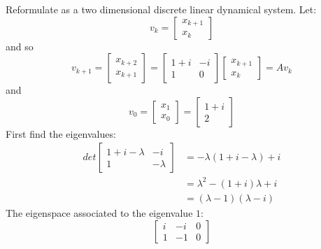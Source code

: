 \documentclass{article}
\begin{document}
\begin{Answer}
  Reformulate as a two dimensional discrete linear dynamical system. Let:
  \begin{equation*}
  v_k = \left[
  \begin{array}{c}
  x_{k+1}\\
  x_k
  \end{array}
  \right]\end{equation*}
  and so
  \begin{equation*}
  v_{k+1} = \left[
  \begin{array}{c}
  x_{k+2}\\
  x_{k+1}
  \end{array}
  \right] = \left[
  \begin{array}{cc}
  1+i & -i\\
  1 & 0
  \end{array}
  \right] \left[
  \begin{array}{c}
  x_{k+1}\\
  x_k
  \end{array}
  \right] = Av_{k}
  \end{equation*}
  and
  \begin{equation*}
  v_0 = \left[
  \begin{array}{c}
  x_1\\
  x_0
  \end{array}
  \right] = \left[
  \begin{array}{c}
  1+i\\
  2
  \end{array}
  \right]
  \end{equation*}
  First find the eigenvalues:
  \begin{align*}
  det \left[
  \begin{array}{cc}
  1+i-\lambda & -i\\
  1 & -\lambda
  \end{array}
  \right] &= -\lambda(1+i-\lambda) +i\\
  &= \lambda^2 - (1+i)\lambda +i\\
  &= (\lambda -1)(\lambda -i)
  \end{align*}
  The eigenspace associated to the eigenvalue $1$:
  \begin{equation*}
  \left[
  \begin{array}{cc|c}
  i&-i&0\\
  1&-1&0
  \end{array}
  \right]
  \end{equation*}
  \begin{equation*}

\end{equation*}
\end{Answer}
\end{document}
